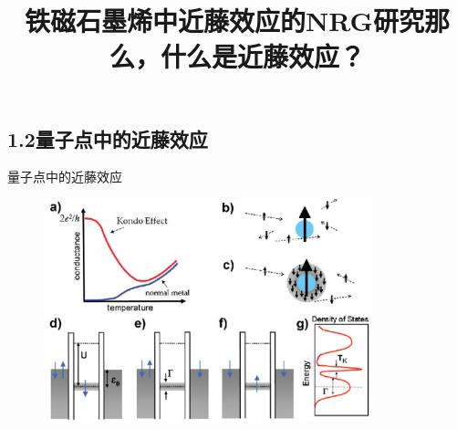 \documentclass[9pt,t]{beamer} %
\begin{document}
\subsection{1.2量子点中的近藤效应}
\title{铁磁石墨烯中近藤效应的NRG研究\qquad \qquad \qquad 那么，什么是近藤效应？}
\begin{frame}{量子点中的近藤效应}
\begin{figure}
\includegraphics[width=0.85\textwidth]{kondo_effect.png}
\end{figure}
\end{frame}
\end{document}
